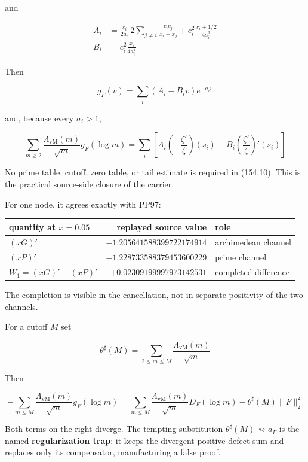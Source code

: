 \documentclass[
  11pt,
]{book}
\begin{document}
and

\[
\begin{aligned}
A_i&=\frac{x_i}{2a_i}\,2\sum_{j\ne i}\frac{c_ic_j}{x_i-x_j}
+c_i^2\frac{x_i+1/2}{4a_i^3}\\
B_i&=c_i^2\frac{x_i}{4a_i^2}
\end{aligned}
\tag{154.8}
\]

Then

\[
g_F(v)=\sum_i(A_i-B_iv)e^{-a_iv}
\tag{154.9}
\]

and, because every \(\sigma_i>1\),

\[
\boxed{
\sum_{m\ge2}\frac{\Lambda_{\mathrm{vM}}(m)}{\sqrt m}g_F(\log m)
=\sum_i\left[
A_i\left(-\frac{\zeta'}\zeta\right)(s_i)
-B_i\left(\frac{\zeta'}\zeta\right)'(s_i)
\right]}
\tag{154.10}
\]

No prime table, cutoff, zero table, or tail estimate is required in
(154.10). This is the practical source-side closure of the carrier.

For one node, it agrees exactly with PP97:

\begin{longtable}[]{@{}lrl@{}}
\toprule\noalign{}
quantity at \(x=0.05\) & replayed source value & role \\
\midrule\noalign{}
\endhead
\bottomrule\noalign{}
\endlastfoot
\((xG)'\) & \(-1.205641588399722174914\) & archimedean channel \\
\((xP)'\) & \(-1.228733588379453600229\) & prime channel \\
\(W_1=(xG)'-(xP)'\) & \(+0.02309199997973142531\) & completed
difference \\
\end{longtable}

The completion is visible in the cancellation, not in separate
positivity of the two channels.

For a cutoff \(M\) set

\[
\theta^\sharp(M)=\sum_{2\le m\le M}
\frac{\Lambda_{\mathrm{vM}}(m)}{\sqrt m}
\tag{154.11}
\]

Then

\[
-\sum_{m\le M}\frac{\Lambda_{\mathrm{vM}}(m)}{\sqrt m}g_F(\log m)
=\sum_{m\le M}\frac{\Lambda_{\mathrm{vM}}(m)}{\sqrt m}D_F(\log m)
-\theta^\sharp(M)\|F\|_2^2
\tag{154.12}
\]

Both terms on the right diverge. The tempting substitution
\(\theta^\sharp(M)\rightsquigarrow a_\Gamma\) is the named
\textbf{regularization trap}: it keeps the divergent positive-defect sum
and replaces only its compensator, manufacturing a false proof.
\end{document}
